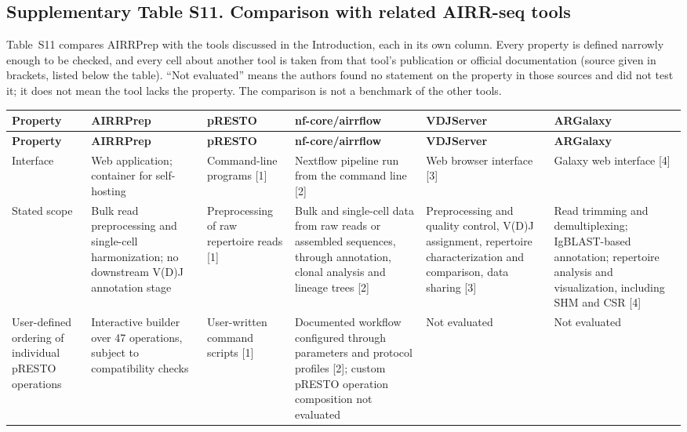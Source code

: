 \documentclass[11pt]{article}
\begin{document}
\clearpage
\begin{landscape}
\section*{Supplementary Table S11. Comparison with related AIRR-seq tools}

Table~S11 compares AIRRPrep with the tools discussed in the Introduction, each
in its own column. Every property is defined narrowly enough to be checked, and
every cell about another tool is taken from that tool's publication or official
documentation (source given in brackets, listed below the table). ``Not
evaluated'' means the authors found no statement on the property in those
sources and did not test it; it does not mean the tool lacks the property. The
comparison is not a benchmark of the other tools.
\footnotesize
\begin{longtable}{p{}p{}p{}p{}p{}p{}}
\toprule
\textbf{Property} & \textbf{AIRRPrep} & \textbf{pRESTO} & \textbf{nf-core/airrflow} & \textbf{VDJServer} & \textbf{ARGalaxy} \\
\midrule
\endfirsthead
\toprule
\textbf{Property} & \textbf{AIRRPrep} & \textbf{pRESTO} & \textbf{nf-core/airrflow} & \textbf{VDJServer} & \textbf{ARGalaxy} \\
\midrule
\endhead
\bottomrule
\endfoot

Interface &
Web application; container for self-hosting &
Command-line programs [1] &
Nextflow pipeline run from the command line [2] &
Web browser interface [3] &
Galaxy web interface [4] \\

Stated scope &
Bulk read preprocessing and single-cell harmonization; no downstream V(D)J annotation stage &
Preprocessing of raw repertoire reads [1] &
Bulk and single-cell data from raw reads or assembled sequences, through annotation, clonal analysis and lineage trees [2] &
Preprocessing and quality control, V(D)J assignment, repertoire characterization and comparison, data sharing [3] &
Read trimming and demultiplexing; IgBLAST-based annotation; repertoire analysis and visualization, including SHM and CSR [4] \\

User-defined ordering of individual pRESTO operations &
Interactive builder over 47 operations, subject to compatibility checks &
User-written command scripts [1] &
Documented workflow configured through parameters and protocol profiles [2]; custom pRESTO operation composition not evaluated &
Not evaluated &
Not evaluated \\


\end{longtable}
\end{landscape}
\end{document}
